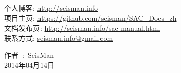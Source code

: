 \begin{flushleft}
个人博客: \url{http://seisman.info}                                     \\
项目主页: \url{https://github.com/seisman/SAC_Docs_zh}                  \\
文档发布页: \url{http://seisman.info/sac-manual.html}                   \\
联系方式: \url{seisman.info@gmail.com}  

\end{flushleft}

\begin{flushright}
作者~:~SeisMan \\
2014年04月14日
\end{flushright}
